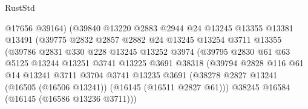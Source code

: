 \begin{lexlean}{RustStd}
\begin{coremodule}
                                  @17656
                                  @39164)
                                (@39840
                                  @13220
                                  @2883
                                  @2944
                                  @24
                                  @13245
                                  @13355
                                  @13381
                                  @13491
                                  (@39775
                                    @2832
                                    @2857
                                    @2882
                                    @24
                                    @13245
                                    @13254
                                    @3711
                                    @13355
                                    (@39786
                                      @2831
                                      @330
                                      @228
                                      @13245
                                      @13252
                                      @3974
                                      (@39795
                                        @2830
                                        @61
                                        @63
                                        @5125
                                        @13244
                                        @13251
                                        @3741
                                        @13225
                                        @3691
                                        @38318
                                        (@39794
                                          @2828
                                          @116
                                          @61
                                          @14
                                          @13241
                                          @3711
                                          @3704
                                          @3741
                                          @13235
                                          @3691
                                          (@38278
                                            @2827
                                            @13241
                                            (@16505 (@16506 @13241))
                                            (@16145 (@16511 @2827 @61)))
                                          @38245
                                          @16584
                                          (@16145 (@16586 @13236 @3711)))

\end{coremodule}
\end{lexlean}
